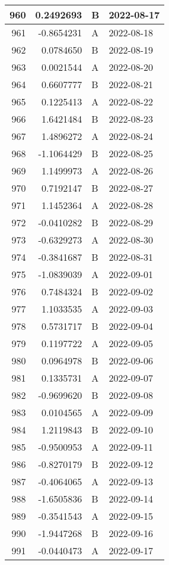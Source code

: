 \begin{tabular}{r|r|l|l}
\hline
960 & 0.2492693 & B & 2022-08-17\\
\hline
961 & -0.8654231 & A & 2022-08-18\\
\hline
962 & 0.0784650 & B & 2022-08-19\\
\hline
963 & 0.0021544 & A & 2022-08-20\\
\hline
964 & 0.6607777 & B & 2022-08-21\\
\hline
965 & 0.1225413 & A & 2022-08-22\\
\hline
966 & 1.6421484 & B & 2022-08-23\\
\hline
967 & 1.4896272 & A & 2022-08-24\\
\hline
968 & -1.1064429 & B & 2022-08-25\\
\hline
969 & 1.1499973 & A & 2022-08-26\\
\hline
970 & 0.7192147 & B & 2022-08-27\\
\hline
971 & 1.1452364 & A & 2022-08-28\\
\hline
972 & -0.0410282 & B & 2022-08-29\\
\hline
973 & -0.6329273 & A & 2022-08-30\\
\hline
974 & -0.3841687 & B & 2022-08-31\\
\hline
975 & -1.0839039 & A & 2022-09-01\\
\hline
976 & 0.7484324 & B & 2022-09-02\\
\hline
977 & 1.1033535 & A & 2022-09-03\\
\hline
978 & 0.5731717 & B & 2022-09-04\\
\hline
979 & 0.1197722 & A & 2022-09-05\\
\hline
980 & 0.0964978 & B & 2022-09-06\\
\hline
981 & 0.1335731 & A & 2022-09-07\\
\hline
982 & -0.9699620 & B & 2022-09-08\\
\hline
983 & 0.0104565 & A & 2022-09-09\\
\hline
984 & 1.2119843 & B & 2022-09-10\\
\hline
985 & -0.9500953 & A & 2022-09-11\\
\hline
986 & -0.8270179 & B & 2022-09-12\\
\hline
987 & -0.4064065 & A & 2022-09-13\\
\hline
988 & -1.6505836 & B & 2022-09-14\\
\hline
989 & -0.3541543 & A & 2022-09-15\\
\hline
990 & -1.9447268 & B & 2022-09-16\\
\hline
991 & -0.0440473 & A & 2022-09-17\\

\end{tabular}
